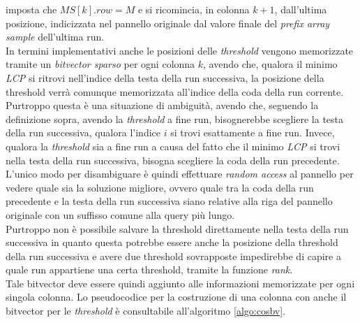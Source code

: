 imposta che $MS[k].row = M$ e si ricomincia, in colonna $k+1$, dall'ultima
posizione, indicizzata nel pannello originale dal valore finale del
\textit{prefix array sample} dell'ultima run.\\
In termini implementativi anche le posizioni delle \textit{threshold} vengono
memorizzate tramite un \textit{bitvector sparso} per ogni colonna $k$, avendo
che, qualora il minimo \textit{LCP} si ritrovi nell'indice della testa della run
successiva, la posizione della threshold verrà comunque memorizzata all'indice
della coda della run corrente. Purtroppo questa è una situazione di ambiguità,
avendo che, seguendo la definizione sopra, avendo la \textit{threshold} a fine
run, bisognerebbe scegliere la testa della run successiva, qualora l'indice $i$
si trovi esattamente a fine run. Invece, qualora la
\textit{threshold} sia a fine run a causa del fatto che il minimo \textit{LCP}
si trovi nella testa della run successiva, bisogna scegliere la coda della run
precedente. L'unico modo per disambiguare è quindi effettuare \textit{random
  access} al pannello per vedere quale sia la
soluzione migliore, ovvero quale tra la coda della run precedente e la testa
della run successiva siano relative alla riga del pannello originale con un
suffisso comune alla query più lungo.\\
Purtroppo non è possibile salvare la threshold direttamente nella testa della
run successiva in quanto questa potrebbe essere anche la posizione della
threshold della run successiva e avere due threshold sovrapposte impedirebbe di
capire a quale run appartiene una certa threshold, tramite la funzione
\textit{rank}. \\
Tale bitvector deve essere quindi aggiunto alle informazioni memorizzate per
ogni singola colonna. Lo pseudocodice per la costruzione di una colonna con
anche il bitvector per le \textit{threshold} è consultabile all'algoritmo
\ref{algo:cosbv}. 
